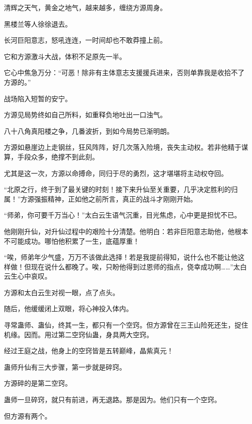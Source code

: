 
\begin{this_body}



清辉之天气，黄金之地气，越来越多，缠绕方源周身。

黑楼兰等人徐徐退去。

长河巨阳意志，怒吼连连，一时间却也不敢莽撞上前。

它和方源激斗大战，体积不足原先一半。

它心中焦急万分：“可恶！除非有主体意志支援援兵进来，否则单靠我是收拾不了方源的。”

战场陷入短暂的安宁。

方源见局势终如自己所料，如重释负地吐出一口浊气。

八十八角真阳楼之争，几番波折，到如今局势已渐明朗。

方源如悬崖边上走钢丝，狂风阵阵，好几次落入险境，丧失主动权。若非他精于谋算，手段众多，绝撑不到此刻。

尤其是这一次，方源以命搏命，同归于尽的勇烈，这才堪堪将主动权夺回。

“北原之行，终于到了最关键的时刻！接下来升仙至关重要，几乎决定胜利的归属！”方源强振精神，正如他之前所言，真正的战斗才刚刚开始。

“师弟，你可要千万当心！”太白云生语气沉重，目光焦虑，心中更是担忧不已。

他刚刚升仙，对升仙过程中的艰险十分清楚。他明白：若非巨阳意志助他，他根本不可能成功。哪怕他积累了一生，底蕴厚重！

“唉，师弟年少气盛，万万不该做此选择！若是我提前得知，说什么也不能让他这样做！但现在说什么都晚了。唉，只盼他得到过恩师的指点，侥幸成功啊……”太白云生心中哀叹。

方源和太白云生对视一眼，点了点头。

随后，他缓缓闭上双眼，将心神投入体内。

寻常蛊师、蛊仙，终其一生，都只有一个空窍。但方源曾在三王山险死还生，捉住机缘。因而。用过第二空窍仙蛊，身具两大空窍。

经过王庭之战，他身上的空窍皆是五转巅峰，晶紫真元！

蛊师升仙有三大步骤，第一步就是碎窍。

方源碎的是第二空窍。

蛊师一旦碎窍，就只有前进，再无退路。那是因为。他们只有一个空窍。

但方源有两个。


\end{this_body}
